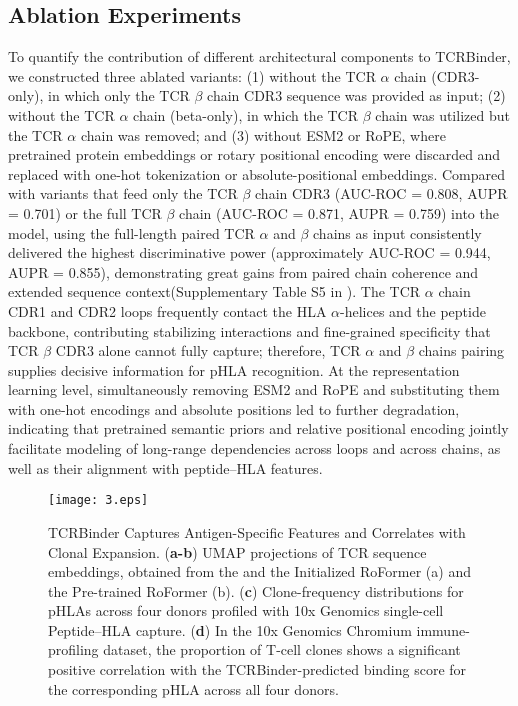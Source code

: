 \documentclass[10pt,letterpaper]{article}
\begin{document}
\subsection*{Ablation Experiments}

To quantify the contribution of different architectural components to TCRBinder, we constructed three ablated variants: (1) without the TCR $\alpha$ chain (CDR3-only), in which only the TCR $\beta$ chain CDR3 sequence was provided as input; (2) without the TCR $\alpha$ chain (beta-only), in which the TCR $\beta$ chain was utilized but the TCR $\alpha$ chain was removed; and (3) without ESM2 or RoPE, where pretrained protein embeddings or rotary positional encoding were discarded and replaced with one-hot tokenization or absolute-positional embeddings. Compared with variants that feed only the TCR $\beta$ chain CDR3 (AUC-ROC = 0.808, AUPR = 0.701) or the full TCR $\beta$ chain (AUC-ROC = 0.871, AUPR = 0.759) into the model, using the full-length paired TCR $\alpha$ and $\beta$ chains as input consistently delivered the highest discriminative power (approximately AUC-ROC = 0.944, AUPR = 0.855), demonstrating great gains from paired chain coherence and extended sequence context(Supplementary Table S5 in ). The TCR $\alpha$ chain CDR1 and CDR2 loops frequently contact the HLA $\alpha$-helices and the peptide backbone, contributing stabilizing interactions and fine-grained specificity that TCR $\beta$ CDR3 alone cannot fully capture; therefore, TCR $\alpha$ and $\beta$ chains pairing supplies decisive information for pHLA recognition. At the representation learning level, simultaneously removing ESM2 and RoPE and substituting them with one-hot encodings and absolute positions led to further degradation, indicating that pretrained semantic priors and relative positional encoding jointly facilitate modeling of long-range dependencies across loops and across chains, as well as their alignment with peptide–HLA features.

\begin{figure}[!h]
    \texttt{[image: 3.eps]}
    \caption{TCRBinder Captures Antigen-Specific Features and Correlates with Clonal Expansion. (\textbf{a-b}) UMAP projections of TCR sequence embeddings, obtained from the and the Initialized RoFormer (a) and the Pre-trained RoFormer (b). (\textbf{c}) Clone-frequency distributions for pHLAs across four donors profiled with 10x Genomics single-cell Peptide–HLA capture. (\textbf{d}) In the 10x Genomics Chromium immune-profiling dataset, the proportion of T-cell clones shows a significant positive correlation with the TCRBinder-predicted binding score for the corresponding pHLA across all four donors.}
\label{fig3}
\end{figure}
\end{document}
